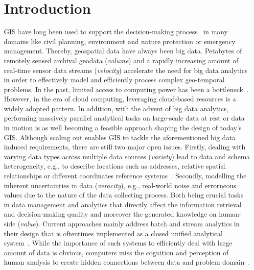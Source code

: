 \documentclass{sig-alternate-05-2015}
\begin{document}


%
%

%
%
\printccsdesc



\section{Introduction}
\label{sec:intro}
GIS have long been used to support the decision-making
process~\cite{Crossland1995} in many domains like civil planning, environment
and nature protection or emergency management. Thereby, geospatial data have
always been big data. Petabytes of remotely sensed archival geodata
(\textit{volume}) and a rapidly increasing amount of real-time sensor data
streams (\textit{velocity}) accelerate the need for big data analytics in order
to effectively model and efficiently process complex geo-temporal problems. In
the past, limited access to computing power has been a
bottleneck~\cite{OGC2013}. However, in the era of cloud computing,
leveraging cloud-based resources is a widely adopted pattern.
In addition, with the advent of big data analytics, performing massively
parallel analytical tasks on large-scale data at rest or data in motion is as
well becoming a feasible approach shaping the design of today's GIS. Although
scaling out enables GIS to tackle the aforementioned big data induced
requirements, there are still two major open issues. Firstly, dealing with
varying data types across multiple data sources (\textit{variety}) lead to data
and schema heterogeneity, e.g., to describe locations such as addresses,
relative spatial relationships or different coordinates reference
systems~\cite{Frank.2016b}. Secondly, modelling the inherent uncertainties in
data (\textit{veracity}), e.g., real-world noise and errorneous values due to
the nature of the data collecting process. Both being crucial tasks in data
management and analytics that directly affect the information retrieval and
decision-making quality and moreover the generated knowledge on human-side
(\textit{value}). Current approaches mainly address batch and stream analytics
in their design that is oftentimes implemented as a closed unified analytical
system~\cite{Thakur2015}. While the importance of such systems to
efficiently deal with large amount of data is obvious, computers miss the
cognition and perception of human analysis to create hidden connections between
data and problem domain~\cite{SSS+14a}.
\end{document}
